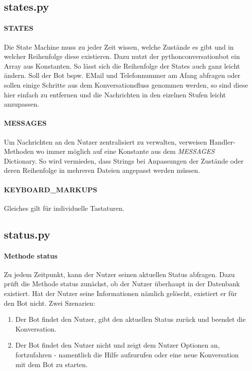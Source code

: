         \subsection{states.py}
            \paragraph{STATES}
                Die State Machine muss zu jeder Zeit wissen, welche Zustände es gibt und in welcher Reihenfolge diese existieren. Dazu nutzt der python\-conversation\-bot \cite{conversationBot} ein Array aus Konstanten. So lässt sich die Reihenfolge der States auch ganz leicht ändern. Soll der Bot bspw. E\-Mail und Telefonnummer am Afang abfragen oder sollen einige Schritte aus dem Konversationsfluss genommen werden, so sind diese hier einfach zu entfernen und die Nachrichten in den eizelnen Stufen leicht anzupassen.

            \paragraph{MESSAGES}
                Um Nachrichten an den Nutzer zentralisiert zu verwalten, verweisen Handler-Methoden wo immer möglich auf eine Konstante aus dem \emph{MESSAGES} Dictionary. So wird vermieden, dass Strings bei Anpassungen der Zustände oder deren Reihenfolge in mehreren Dateien angepasst werden müssen.
            
            \paragraph{KEYBOARD\_MARKUPS}
                Gleiches gilt für individuelle Tastaturen. 
                

        \subsection{status.py}
            \paragraph{Methode status}
                Zu jedem Zeitpunkt, kann der Nutzer seinen aktuellen Status abfragen. Dazu prüft die Methode status zunächst, ob der Nutzer überhaupt in der Datenbank existiert. Hat der Nutzer seine Informationen nämlich gelöscht, existiert er für den Bot nicht. Zwei Szenarien: 
                \begin{enumerate}
                    \item Der Bot findet den Nutzer, gibt den aktuellen Status zurück und beendet die Konversation.
                    \item Der Bot findet den Nutzer nicht und zeigt dem Nutzer Optionen an, fortzufahren - namentlich die Hilfe aufzurufen oder eine neue Konversation mit dem Bot zu starten.
                \end{enumerate}
        

